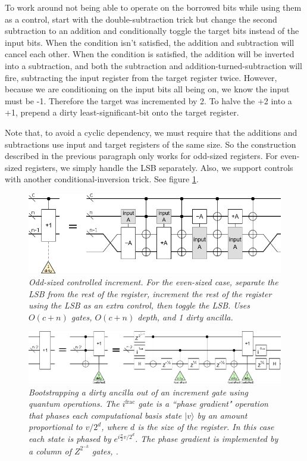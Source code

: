 \documentclass[twocolumn]{article}
\begin{document}
To work around not being able to operate on the borrowed bits while using them as a control, start with the double-subtraction trick but change the second subtraction to an addition and conditionally toggle the target bits instead of the input bits.
When the condition isn't satisfied, the addition and subtraction will cancel each other.
When the condition is satisfied, the addition will be inverted into a subtraction, and both the subtraction and addition-turned-subtraction will fire, subtracting the input register from the target register twice.
However, because we are conditioning on the input bits all being on, we know the input must be -1.
Therefore the target was incremented by 2.
To halve the +2 into a +1, prepend a dirty least-significant-bit onto the target register.

Note that, to avoid a cyclic dependency, we must require that the additions and subtractions use input and target registers of the same size.
So the construction described in the previous paragraph only works for odd-sized registers.
For even-sized registers, we simply handle the LSB separately.
Also, we support controls with another conditional-inversion trick.
See figure \ref{fig:controlled-increment-odd}.

\begin{figure}
  \centering
  \includegraphics[width=\linewidth]{assets/controlled-increment-odd.png}
  \caption{\em
    Odd-sized controlled increment.
    For the even-sized case, separate the LSB from the rest of the register, increment the rest of the register using the LSB as an extra control, then toggle the LSB.
    Uses $O(c+n)$ gates, $O(c+n)$ depth, and 1 dirty ancilla.
  }
  \label{fig:controlled-increment-odd}
\end{figure}

\begin{figure}
  \centering
  \includegraphics[width=\linewidth]{assets/ancilla-bootstrap.png}
  \caption{\em Bootstrapping a dirty ancilla out of an increment gate using quantum operations.
  The $i^{\text{frac}}$ gate is a ``phase gradient" operation that phases each computational basis state $|v\rangle$ by an amount proportional to $v/2^d$, where $d$ is the size of the register.
  In this case each state is phased by $e^{i \frac{\pi}{2} v/2^d}$.
  The phase gradient is implemented by a column of $Z^{2^{-k}}$ gates, .}
  \label{fig:bootstrap-ancilla}
\end{figure}
\end{document}
